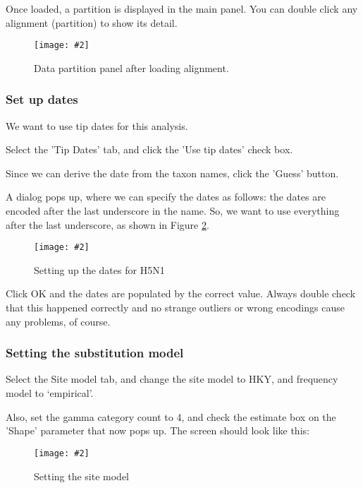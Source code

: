 \documentclass{article}
\newcommand{\includeimage}[2][]{%
\texttt{[image: \#2]}
}
\begin{document}
Once loaded, a partition is displayed in the main panel.
You can double click any alignment (partition) to show its detail.

\begin{figure}
\centering	
\includeimage[scale=0.3,clip=true,trim=0 400 0 0]{figures/BEAUti_DataPartitions}
\caption{Data partition panel after loading alignment.}
\label{fig.datapartition} 
\end{figure}

\subsubsection*{Set up dates}

We want to use tip dates for this analysis.

Select the 'Tip Dates' tab, and click the 'Use tip dates' check box.

Since we can derive the date from the taxon names, click the 'Guess' button.

A dialog pops up, where we can specify the dates as follows: the dates are encoded after the last underscore in the name.
So, we want to use everything after the last underscore, as shown in Figure \ref{fig.dates}.

\begin{figure}
\centering	
\includeimage[scale=0.3]{figures/BEAUti_dates}
\caption{Setting up the dates for H5N1}
\label{fig.dates}
\end{figure}

Click OK and the dates are populated by the correct value. Always double check that this happened correctly and no strange outliers or wrong encodings cause any problems, of course.

\subsubsection*{Setting the substitution model}

Select the Site model tab, and change the site model to HKY, and frequency model to `empirical'.

Also, set the gamma category count to 4, and check the estimate box on the 'Shape' parameter that now pops up.
The screen should look like this:

\begin{figure}
\centering	
\includeimage[scale=0.3,clip=true,trim=0 400 0 0]{figures/BEAUti_sitemodel}
\caption{Setting the site model}
\label{fig.BEAUti_sitemodel}
\end{figure}
\end{document}
